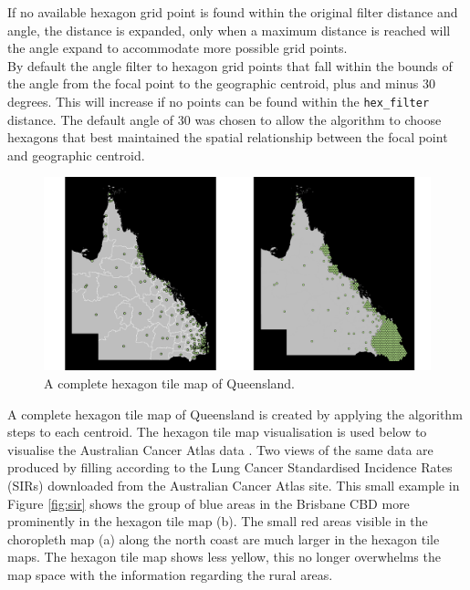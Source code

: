 \documentclass{monashthesis}
\begin{document}
If no available hexagon grid point is found within the original filter distance and angle, the distance is expanded, only when a maximum distance is reached will the angle expand to accommodate more possible grid points.\\
By default the angle filter to hexagon grid points that fall within the bounds of the angle from the focal point to the geographic centroid, plus and minus 30 degrees. This will increase if no points can be found within the \texttt{hex\_filter} distance. The default angle of 30 was chosen to allow the algorithm to choose hexagons that best maintained the spatial relationship between the focal point and geographic centroid.

\begin{figure}[H]
\centering
\includegraphics[width=16cm]{figures/03-algorithm/6allocate.pdf}
\caption{\label{fig:buffs}A complete hexagon tile map of Queensland.}
\end{figure}

A complete hexagon tile map of Queensland is created by applying the algorithm steps to each centroid.
The hexagon tile map visualisation is used below to visualise the Australian Cancer Atlas data \autocite{TACA}. Two views of the same data are produced by filling according to the Lung Cancer Standardised Incidence Rates (SIRs) downloaded from the Australian Cancer Atlas site. This small example in Figure \ref{fig:sir} shows the group of blue areas in the Brisbane CBD more prominently in the hexagon tile map (b).
The small red areas visible in the choropleth map (a) along the north coast are much larger in the hexagon tile maps. The hexagon tile map shows less yellow, this no longer overwhelms the map space with the information regarding the rural areas.
\end{document}
